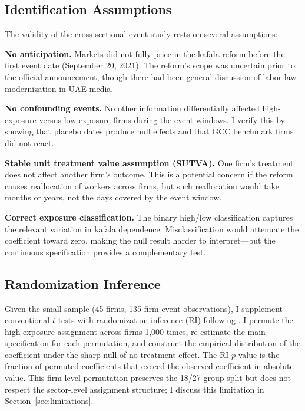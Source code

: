 \documentclass[12pt]{article}
\begin{document}
\subsection{Identification Assumptions}

The validity of the cross-sectional event study rests on several assumptions:

\textbf{No anticipation.} Markets did not fully price in the kafala reform before the first event date (September 20, 2021). The reform's scope was uncertain prior to the official announcement, though there had been general discussion of labor law modernization in UAE media.

\textbf{No confounding events.} No other information differentially affected high-exposure versus low-exposure firms during the event windows. I verify this by showing that placebo dates produce null effects and that GCC benchmark firms did not react.

\textbf{Stable unit treatment value assumption (SUTVA).} One firm's treatment does not affect another firm's outcome. This is a potential concern if the reform causes reallocation of workers across firms, but such reallocation would take months or years, not the days covered by the event window.

\textbf{Correct exposure classification.} The binary high/low classification captures the relevant variation in kafala dependence. Misclassification would attenuate the coefficient toward zero, making the null result harder to interpret---but the continuous specification provides a complementary test.

\subsection{Randomization Inference}

Given the small sample (45 firms, 135 firm-event observations), I supplement conventional $t$-tests with randomization inference (RI) following \citet{fisher1933design}. I permute the high-exposure assignment across firms 1,000 times, re-estimate the main specification for each permutation, and construct the empirical distribution of the coefficient under the sharp null of no treatment effect. The RI $p$-value is the fraction of permuted coefficients that exceed the observed coefficient in absolute value. This firm-level permutation preserves the 18/27 group split but does not respect the sector-level assignment structure; I discuss this limitation in Section~\ref{sec:limitations}.
\end{document}
